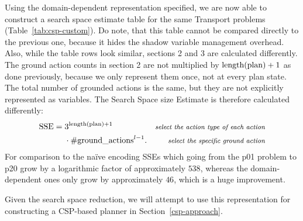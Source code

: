 Using the domain-dependent representation specified, we are now able to construct
a search space estimate table for the same Transport problems (Table~\ref{tab:csp-custom}). 
Do note, that this table cannot be compared directly to the previous one,
because it hides the shadow variable management overhead.
Also, while the table rows look similar, sections 2 and 3 are calculated
differently. The ground action counts in section 2 are not multiplied by $\textrm{length(plan)} + 1$
as done previously, because we only represent them once, not at every plan state.
The total number of grounded actions is the same, but they are not explicitly represented as variables. The Search Space size Estimate is therefore calculated differently:
\begin{align*}
\textrm{SSE} =\; &3^{\textrm{length(plan)} + 1} & \textit{\footnotesize select the action type of each action}\\
&\cdot \textrm{\#ground\_actions}^{l-1}. & \textit{\footnotesize select the specific ground action}
\end{align*}
For comparison to the na{\"{i}}ve encoding SSEs which going from the p01 problem to p20 grow by a logarithmic factor of approximately $538$,
whereas the domain-dependent ones only grow by approximately $46$,
which is a huge improvement.

Given the search space reduction, we will attempt to use this representation
for constructing a CSP-based planner in Section~\ref{csp-approach}.

